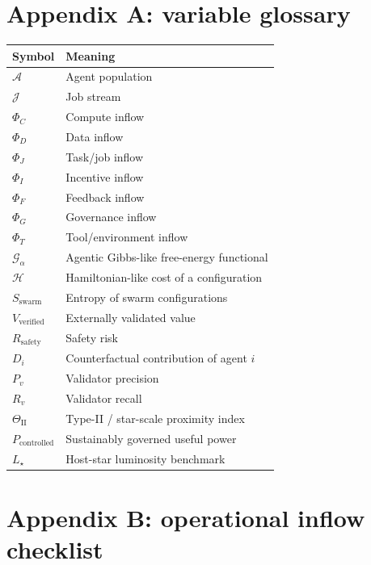 \documentclass[11pt]{article}
\begin{document}
\section{Appendix A: variable glossary}\label{appendix-a-variable-glossary}

\begin{longtable}[]{@{}ll@{}}
\toprule\noalign{}
Symbol & Meaning \\
\midrule\noalign{}
\endhead
\bottomrule\noalign{}
\endlastfoot
\(\mathcal{A}\) & Agent population \\
\(\mathcal{J}\) & Job stream \\
\(\Phi_C\) & Compute inflow \\
\(\Phi_D\) & Data inflow \\
\(\Phi_J\) & Task/job inflow \\
\(\Phi_I\) & Incentive inflow \\
\(\Phi_F\) & Feedback inflow \\
\(\Phi_G\) & Governance inflow \\
\(\Phi_T\) & Tool/environment inflow \\
\(\mathcal{G}_{\alpha}\) & Agentic Gibbs-like free-energy functional \\
\(\mathcal{H}\) & Hamiltonian-like cost of a configuration \\
\(S_{\text{swarm}}\) & Entropy of swarm configurations \\
\(V_{\text{verified}}\) & Externally validated value \\
\(R_{\text{safety}}\) & Safety risk \\
\(D_i\) & Counterfactual contribution of agent \(i\) \\
\(P_v\) & Validator precision \\
\(R_v\) & Validator recall \\
\(\Theta_{\mathrm{II}}\) & Type-II / star-scale proximity index \\
\(P_{\text{controlled}}\) & Sustainably governed useful power \\
\(L_{\star}\) & Host-star luminosity benchmark \\
\end{longtable}

\section{Appendix B: operational inflow checklist}\label{appendix-b-operational-inflow-checklist}
\end{document}
